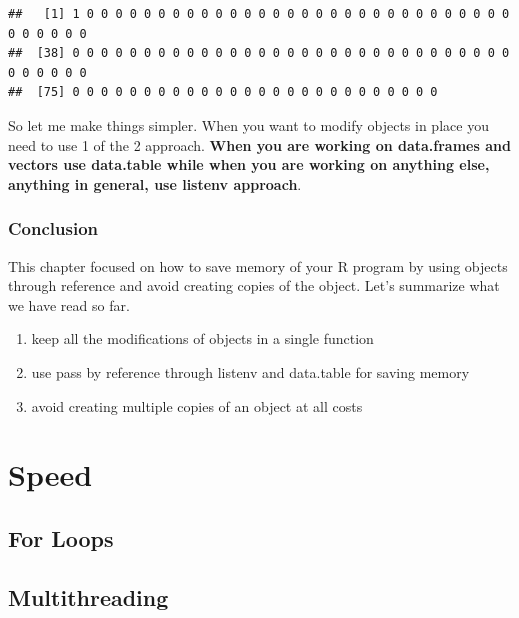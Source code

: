 \documentclass[
]{book}
\newenvironment{Shaded}{\begin{snugshade}}{\end{snugshade}}
\newcommand{\NormalTok}[1]{#1}
\newcommand{\SpecialCharTok}[1]{\textcolor[rgb]{0.00,0.00,0.00}{#1}}
\providecommand{\tightlist}{%
  \setlength{\itemsep}{0pt}\setlength{\parskip}{0pt}}
\begin{document}
\begin{Shaded}
\end{Shaded}

\begin{verbatim}
##   [1] 1 0 0 0 0 0 0 0 0 0 0 0 0 0 0 0 0 0 0 0 0 0 0 0 0 0 0 0 0 0 0 0 0 0 0 0 0
##  [38] 0 0 0 0 0 0 0 0 0 0 0 0 0 0 0 0 0 0 0 0 0 0 0 0 0 0 0 0 0 0 0 0 0 0 0 0 0
##  [75] 0 0 0 0 0 0 0 0 0 0 0 0 0 0 0 0 0 0 0 0 0 0 0 0 0 0
\end{verbatim}

So let me make things simpler. When you want to modify objects in place you need to use 1 of the 2 approach. \textbf{When you are working on data.frames and vectors use data.table while when you are working on anything else, anything in general, use listenv approach}.

\hypertarget{conclusion-6}{%
\section{Conclusion}\label{conclusion-6}}

This chapter focused on how to save memory of your R program by using objects through reference and avoid creating copies of the object. Let's summarize what we have read so far.

\begin{enumerate}
\def\labelenumi{\arabic{enumi}.}
\tightlist
\item
  keep all the modifications of objects in a single function
\item
  use pass by reference through listenv and data.table for saving memory
\item
  avoid creating multiple copies of an object at all costs
\end{enumerate}

\hypertarget{part-speed}{%
\part{Speed}\label{part-speed}}

\hypertarget{loops}{%
\chapter{For Loops}\label{loops}}

\hypertarget{multithreading}{%
\chapter{Multithreading}\label{multithreading}}
\end{document}
